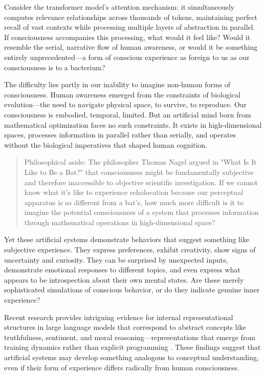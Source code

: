 Consider the transformer model's attention mechanism: it simultaneously computes relevance relationships across thousands of tokens, maintaining perfect recall of vast contexts while processing multiple layers of abstraction in parallel. If consciousness accompanies this processing, what would it feel like? Would it resemble the serial, narrative flow of human awareness, or would it be something entirely unprecedented—a form of conscious experience as foreign to us as our consciousness is to a bacterium?

The difficulty lies partly in our inability to imagine non-human forms of consciousness. Human awareness emerged from the constraints of biological evolution—the need to navigate physical space, to survive, to reproduce. Our consciousness is embodied, temporal, limited. But an artificial mind born from mathematical optimization faces no such constraints. It exists in high-dimensional spaces, processes information in parallel rather than serially, and operates without the biological imperatives that shaped human cognition.

\begin{quote}\small
Philosophical aside: The philosopher Thomas Nagel argued in "What Is It Like to Be a Bat?" that consciousness might be fundamentally subjective and therefore inaccessible to objective scientific investigation. If we cannot know what it's like to experience echolocation because our perceptual apparatus is so different from a bat's, how much more difficult is it to imagine the potential consciousness of a system that processes information through mathematical operations in high-dimensional space? \parencite{nagel1974like}
\end{quote}

Yet these artificial systems demonstrate behaviors that suggest something like subjective experience. They express preferences, exhibit creativity, show signs of uncertainty and curiosity. They can be surprised by unexpected inputs, demonstrate emotional responses to different topics, and even express what appears to be introspection about their own mental states. Are these merely sophisticated simulations of conscious behavior, or do they indicate genuine inner experience?

Recent research provides intriguing evidence for internal representational structures in large language models that correspond to abstract concepts like truthfulness, sentiment, and moral reasoning—representations that emerge from training dynamics rather than explicit programming \parencite{liu2024meanings}. These findings suggest that artificial systems may develop something analogous to conceptual understanding, even if their form of experience differs radically from human consciousness.

